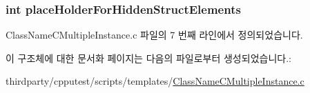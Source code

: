 \subsubsection[{\texorpdfstring{place\+Holder\+For\+Hidden\+Struct\+Elements}{placeHolderForHiddenStructElements}}]{\setlength{\rightskip}{0pt plus 5cm}int place\+Holder\+For\+Hidden\+Struct\+Elements}\hypertarget{struct_class_name_struct_a5705d42d83aa1408a1f19b218cd11502}{}\label{struct_class_name_struct_a5705d42d83aa1408a1f19b218cd11502}


Class\+Name\+C\+Multiple\+Instance.\+c 파일의 7 번째 라인에서 정의되었습니다.



이 구조체에 대한 문서화 페이지는 다음의 파일로부터 생성되었습니다.\+:\begin{DoxyCompactItemize}
\item 
thirdparty/cpputest/scripts/templates/\hyperlink{templates_2_class_name_c_multiple_instance_8c}{Class\+Name\+C\+Multiple\+Instance.\+c}\end{DoxyCompactItemize}
